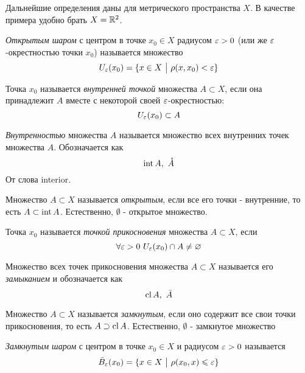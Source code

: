 \begin{note}
	Дальнейшие определения даны для метрического пространства $X$. В качестве примера удобно брать $X = \mathbb{R}^2$.
\end{note}

\begin{definition}
	\textit{Открытым шаром} с центром в точке $x_0 \in X$ радиусом $\varepsilon > 0$ (или же $\varepsilon$-окрестностью точки $x_0$) называется множество
	\[
		U_\varepsilon(x_0) = \{x \in X \ \big|\  \rho(x, x_0) < \varepsilon\}
	\]
\end{definition}

\begin{definition}
	Точка $x_0$ называется \textit{внутренней точкой} множества $A \subset X$, если она принадлежит $A$ вместе с некоторой своей $\varepsilon$-окрестностью:
	\[
		U_\varepsilon(x_0) \subset A
	\]
\end{definition}

\begin{definition}
	\textit{Внутренностью} множества $A$ называется множество всех внутренних точек множества $A$. Обозначается как
	\[
		\operatorname{int} A,\ \mathring{A}
	\]
	От слова interior.
\end{definition}

\begin{definition}
	Множество $A \subset X$ называется \textit{открытым}, если все его точки - внутренние, то есть $A \subset \operatorname{int} A$. Естественно, $\emptyset$ - открытое множество.
\end{definition}

\begin{definition}
	Точка $x_0$ называется \textit{точкой прикосновения} множества $A \subset X$, если
	\[
		\forall \varepsilon > 0\ U_\varepsilon(x_0) \cap A \neq \varnothing
	\]
\end{definition}

\begin{definition}
	Множество всех точек прикосновения множества $A \subset X$ называется его \textit{замыканием} и обозначается как
	\[
		\operatorname{cl} A,\ \bar{A}
	\]
\end{definition}

\begin{definition}
	Множество $A \subset X$ называется \textit{замкнутым}, если оно содержит все свои точки прикосновения, то есть $A \supset \operatorname{cl} A$. Естественно, $\emptyset$ - замкнутое множество
\end{definition}

\begin{definition}
	\textit{Замкнутым шаром} с центром в точке $x_0 \in X$ и радиусом $\varepsilon > 0$ называется
	\[
		\bar{B}_\varepsilon(x_0) = \{x \in X \ \big|\  \rho(x_0, x) \leqslant \varepsilon\}
	\] 
\end{definition}

